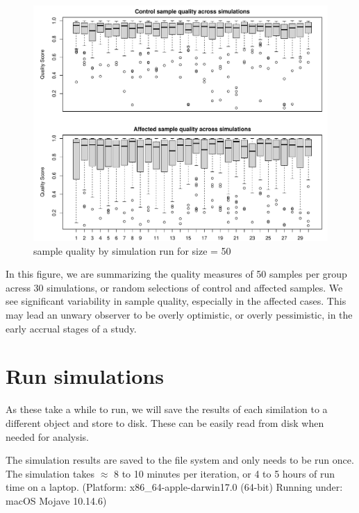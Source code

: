 \documentclass[
]{book}
\begin{document}
\begin{figure}
\centering
\includegraphics{Static/figures/look-sim-qual-0-50ONLY-1.pdf}
\caption{\label{fig:look-sim-qual-0-50ONLY}sample quality by simulation run for size = 50}
\end{figure}

In this figure, we are summarizing the quality measures of 50 samples per group acress
30 simulations, or random selections of control and affected samples.
We see significant variability in sample quality, especially in the affected cases.
This may lead an unwary observer to be overly optimistic, or overly pessimistic,
in the early accrual stages of a study.

\hypertarget{run-simulations}{%
\section{Run simulations}\label{run-simulations}}

As these take a while to run,
we will save the results of each similation to a different
object and store to disk. These can be easily read from disk
when needed for analysis.

The simulation results are saved to the file system and
only needs to be run once. The simulation takes \(\approx\) 8 to 10 minutes
per iteration, or 4 to 5 hours of run time on a laptop.
(Platform: x86\_64-apple-darwin17.0 (64-bit)
Running under: macOS Mojave 10.14.6)
\end{document}
